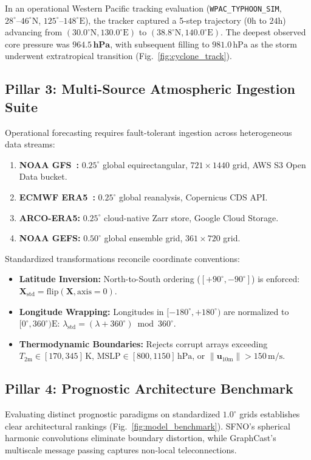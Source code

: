 \documentclass[10pt,twocolumn,letterpaper]{article}
\begin{document}
In an operational Western Pacific tracking evaluation (\texttt{WPAC\_TYPHOON\_SIM}, $28^\circ\text{--}46^\circ\text{N}$, $125^\circ\text{--}148^\circ\text{E}$), the tracker captured a 5-step trajectory ($0\si{\hour}$ to $24\si{\hour}$) advancing from $(30.0^\circ\text{N}, 130.0^\circ\text{E})$ to $(38.8^\circ\text{N}, 140.0^\circ\text{E})$. The deepest observed core pressure was $\mathbf{964.5\,\text{hPa}}$, with subsequent filling to $981.0\,\text{hPa}$ as the storm underwent extratropical transition (Fig.~\ref{fig:cyclone_track}).

\subsection{Pillar 3: Multi-Source Atmospheric Ingestion Suite}
Operational forecasting requires fault-tolerant ingestion across heterogeneous data streams:
\begin{enumerate}
    \item \textbf{NOAA GFS~\cite{ncep2021gfs}:} $0.25^\circ$ global equirectangular, $721 \times 1440$ grid, AWS S3 Open Data bucket.
    \item \textbf{ECMWF ERA5~\cite{hersbach2020era5}:} $0.25^\circ$ global reanalysis, Copernicus CDS API.
    \item \textbf{ARCO-ERA5:} $0.25^\circ$ cloud-native Zarr store, Google Cloud Storage.
    \item \textbf{NOAA GEFS:} $0.50^\circ$ global ensemble grid, $361 \times 720$ grid.
\end{enumerate}

Standardized transformations reconcile coordinate conventions:
\begin{itemize}
    \item \textbf{Latitude Inversion:} North-to-South ordering ($[+90^\circ, -90^\circ]$) is enforced: $\mathbf{X}_\mathrm{std} = \mathrm{flip}(\mathbf{X}, \text{axis}=0)$.
    \item \textbf{Longitude Wrapping:} Longitudes in $[-180^\circ, +180^\circ)$ are normalized to $[0^\circ, 360^\circ)\text{E}$: $\lambda_\mathrm{std} = (\lambda + 360^\circ) \bmod 360^\circ$.
    \item \textbf{Thermodynamic Boundaries:} Rejects corrupt arrays exceeding $T_\mathrm{2m} \in [170, 345]\,\si{\kelvin}$, $\mathrm{MSLP} \in [800, 1150]\,\text{hPa}$, or $\|\mathbf{u}_{10\mathrm{m}}\| > 150\,\si{\meter\per\second}$.
\end{itemize}

\subsection{Pillar 4: Prognostic Architecture Benchmark}
Evaluating distinct prognostic paradigms on standardized $1.0^\circ$ grids establishes clear architectural rankings (Fig.~\ref{fig:model_benchmark}). SFNO's spherical harmonic convolutions eliminate boundary distortion, while GraphCast's multiscale message passing captures non-local teleconnections.
\end{document}
